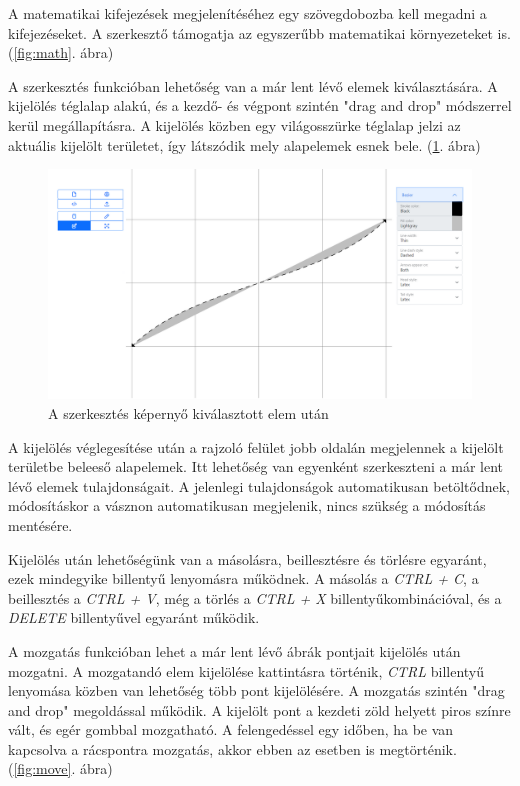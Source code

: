 A matematikai kifejezések megjelenítéséhez egy szövegdobozba kell megadni a kifejezéseket. A szerkesztő támogatja az egyszerűbb matematikai környezeteket is. (\ref{fig:math}. ábra)



A szerkesztés funkcióban lehetőség van a már lent lévő elemek kiválasztására. A kijelölés téglalap alakú, és a kezdő- és végpont szintén "drag and drop" módszerrel kerül megállapításra. A kijelölés közben egy világosszürke téglalap jelzi az aktuális kijelölt területet, így látszódik mely alapelemek esnek bele. (\ref{fig:edit}. ábra)

\begin{figure}[!h]
	\centering
	\includegraphics[width=\textwidth]{images/editor_edit.png}
	\caption{A szerkesztés képernyő kiválasztott elem után}
	\label{fig:edit}
\end{figure}

A kijelölés véglegesítése után a rajzoló felület jobb oldalán megjelennek a kijelölt területbe beleeső alapelemek. Itt lehetőség van egyenként szerkeszteni a már lent lévő elemek tulajdonságait. A jelenlegi tulajdonságok automatikusan betöltődnek, módosításkor a vásznon automatikusan megjelenik, nincs szükség a módosítás mentésére.

Kijelölés után lehetőségünk van a másolásra, beillesztésre és törlésre egyaránt, ezek mindegyike billentyű lenyomásra működnek. A másolás a  \textit{CTRL + C}, a beillesztés a \textit{CTRL + V}, még a törlés a \textit{CTRL + X} billentyűkombinációval, és a \textit{DELETE} billentyűvel egyaránt működik.


A mozgatás funkcióban lehet a már lent lévő ábrák pontjait kijelölés után mozgatni. A mozgatandó elem kijelölése kattintásra történik, \textit{CTRL} billentyű lenyomása közben van lehetőség több pont kijelölésére. A mozgatás szintén "drag and drop" megoldással működik. A kijelölt pont a kezdeti zöld helyett piros színre vált, és egér gombbal mozgatható. A felengedéssel egy időben, ha be van kapcsolva a rácspontra mozgatás, akkor ebben az esetben is megtörténik.  (\ref{fig:move}. ábra)

